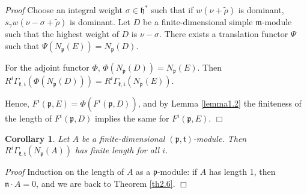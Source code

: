 \documentclass[11pt]{amsart}
\newcounter{theorem}
\newtheorem{corollary}[theo]{Corollary}
\renewenvironment{proof}{ \emph{Proof}}{$\Box$}
\renewcommand{\tt}{\mathfrak{t}}
\newcommand{\kk}{\mathfrak{k}}
\newcommand{\nn}{\mathfrak{n}}
\newcommand{\mm}{\mathfrak{m}}
\newcommand{\hh}{\mathfrak{h}}
\newcommand{\pp}{\mathfrak{p}}
\newcommand{\refth}[1]{Theorem \ref{#1}}
\newcommand{\refle}[1]{Lemma \ref{#1}}
\begin{document}
\begin{proof}
Choose an integral weight $\sigma\in\hh^*$ such that if $w(\nu+\tilde{\rho})$ is dominant, $s_{\gamma}w(\nu-\sigma+\tilde{\rho})$ is dominant. Let $D$ be a finite-dimensional simple $\mm$-module such that the highest weight of $D$ is $\nu-\sigma$. There exists a translation functor $\Psi$ such that $\Psi(N_\pp(E))=N_\pp(D)$. 

For the adjoint functor $\Phi$, $\Phi(N_\pp(D))=N_\pp(E)$. Then $R^{i}\Gamma_{\kk,\tt}(\Phi(N_\pp(D)))=R^{i}\Gamma_{\kk,\tt}(N_\pp(E))$. 

Hence, $F^{i}(\pp,E)=\Phi (F^{i}(\pp,D))$, and by \refle{lemma1.2} the finiteness of the length of $F^{i}(\pp,D)$ implies the same for $F^{i}(\pp,E)$. 
\end{proof}
\begin{corollary}
Let $A$ be a finite-dimensional $(\pp,\tt)$-module. Then $R^{i}\Gamma_{\kk,\tt}(N_\pp(A))$ has finite length for all $i$.
\end{corollary}
\begin{proof}
Induction on the length of $A$ as a $\pp$-module: if $A$ has length 1, then $\nn\cdot A=0$, and we are back to \refth{th2.6}.
\end{proof}
\end{document}
